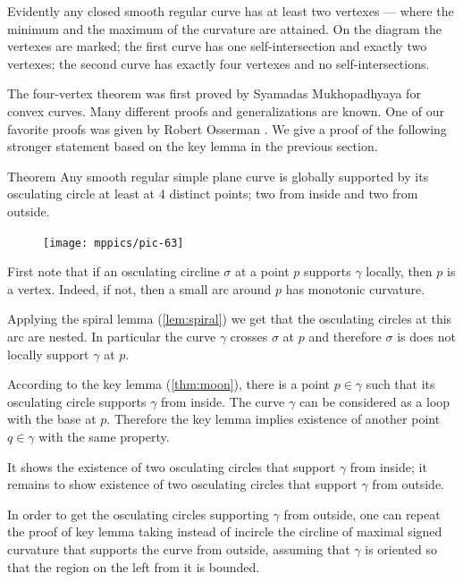 Evidently any closed smooth regular curve has at least two vertexes --- where the minimum and the maximum of the curvature are attained.
On the diagram the vertexes are marked;
the first curve has one self-intersection and exactly two vertexes;
the second curve has exactly four vertexes and no self-intersections.

The four-vertex theorem was first proved by Syamadas Mukhopadhyaya \cite{mukhopadhyaya} for convex curves.
Many different proofs and generalizations are known.
One of our favorite proofs was given by Robert Osserman \cite{osserman}.
We give a proof  of the following stronger statement  based on the key lemma in the previous section.


\begin{thm}{Theorem}\label{thm:4-vert-supporting}
Any smooth regular simple plane curve is globally supported by its osculating circle at least at 4 distinct points; two from inside and two from outside.
\end{thm}

{

\begin{figure}
\vskip-0mm
\centering
\texttt{[image: mppics/pic-63]}
\vskip0mm
\end{figure}

First note that if an osculating circline $\sigma$ at a point $p$ supports $\gamma$ locally, then $p$ is a vertex.
Indeed, if not, then a small arc around $p$ has monotonic curvature.

Applying the spiral lemma (\ref{lem:spiral}) we get that the osculating circles at this arc are nested.
In particular the curve $\gamma$ crosses $\sigma$ at $p$ and therefore $\sigma$ is does not locally support $\gamma$ at $p$.
\qeds

}

According to the key lemma (\ref{thm:moon}), there is a point $p\in\gamma$ such that its osculating circle supports $\gamma$ from inside.
The curve $\gamma$ can be considered as a loop with the base at $p$.
Therefore the key lemma implies existence of another point $q\in\gamma$ with the same property.

It shows the existence of two osculating circles that support $\gamma$ from inside;
it remains to show existence of two osculating circles that support $\gamma$ from outside.

In order to get the osculating circles supporting $\gamma$ from outside, one can repeat the proof of key lemma taking instead of incircle the circline of maximal signed curvature that supports the curve from outside, assuming that $\gamma$ is oriented so that the region on the left from it is bounded.%

